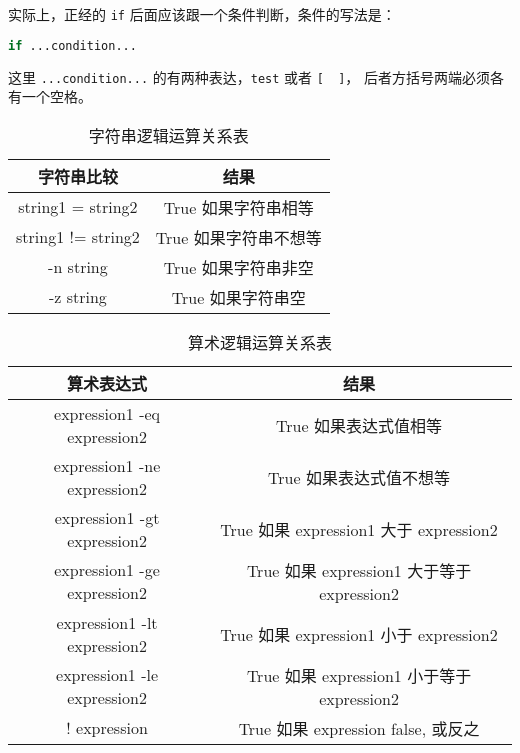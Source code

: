 \documentclass[a4paper]{ctexart}
\begin{document}
实际上，正经的 \verb|if| 后面应该跟一个条件判断，条件的写法是：
\begin{lstlisting}[language=sh]
if ...condition...
\end{lstlisting}
这里 \verb|...condition...| 的有两种表达，\verb|test| 或者 \verb|[  ]|，
后者方括号两端必须各有一个空格。

\begin{table}[p!]
\caption{字符串逻辑运算关系表}
\centering
\begin{tabular}{|c|c|}
\hline
字符串比较 & 结果 \\
\hline
string1 = string2 & True 如果字符串相等 \\
\hline
string1 != string2 & True 如果字符串不想等 \\
\hline
-n string & True 如果字符串非空 \\
\hline
-z string & True 如果字符串空 \\
\hline
\end{tabular}
\end{table}

\begin{table}[p!]
  
\caption{算术逻辑运算关系表}
\centering
\begin{tabular}{|c|c|}
\hline
算术表达式 & 结果 \\
\hline
expression1 -eq expression2 & True 如果表达式值相等\\
\hline
expression1 -ne expression2 & True 如果表达式值不想等\\
\hline
expression1 -gt expression2 & True 如果 expression1 大于 expression2\\
\hline
expression1 -ge expression2 & True 如果 expression1 大于等于 expression2\\
\hline
expression1 -lt expression2 & True 如果 expression1 小于 expression2\\
\hline
expression1 -le expression2 & True 如果 expression1 小于等于 expression2\\
\hline
! expression & True 如果 expression false, 或反之\\
\hline
\end{tabular}
\end{table}
\end{document}
